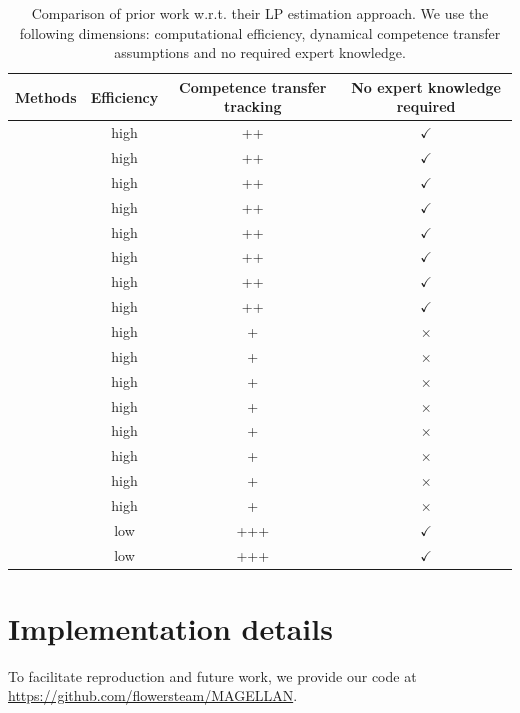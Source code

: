 \begin{table}[h!] 
\centering 
\small
\begin{tabular}{|l|c|c|c|}
\hline
\textbf{Methods} & \textbf{Efficiency} & \textbf{Competence transfer tracking} & \textbf{No expert knowledge required} \\ 
\hline 
\cite{oudeyer_intrinsic_2007} & high & ++ & $\checkmark$ \\ 
\cite{baranes_r-iac_2009} & high & ++ & $\checkmark$ \\ 
\cite{baranes_active_2013} & high & ++ & $\checkmark$ \\ 
\cite{moulin-frier_exploration_2013} & high & ++ & $\checkmark$ \\ 
\cite{moulin-frier_self-organization_2014} & high & ++ & $\checkmark$ \\ 
\cite{portelas_teacher_2019} & high & ++ & $\checkmark$ \\ 
\cite{forestier_modular_2016} & high & ++ & $\checkmark$ \\ 
\cite{kovac_grimgep_2023} & high & ++ & $\checkmark$ \\ 
\hline 
\cite{stout_competence_2010} & high & + & $\times$ \\ 
\cite{lopes_strategic_2012} & high & + & $\times$ \\ 
\cite{matiisen_teacher-student_2017} & high & + & $\times$ \\ 
\cite{fournier_accuracy-based_2018} & high & + & $\times$ \\ 
\cite{colas_curious_2019} & high & + & $\times$ \\ 
\cite{blaes_control_2019} & high & + & $\times$ \\ 
\cite{akakzia_grounding_2021} & high & + & $\times$ \\ 
\cite{kumar_practice_2024} & high & + & $\times$ \\ 
\hline 
\cite{kanitscheider_multi-task_2021} & low & +++ & $\checkmark$ \\ 
\cite{zhang_omni_2024} & low & +++ & $\checkmark$ \\ 
\hline 
\end{tabular}
\caption{Comparison of prior work w.r.t. their LP estimation approach. We use the following dimensions: computational efficiency, dynamical competence transfer assumptions and no required expert knowledge.} 
\label{tab:table_lp_literature}
\end{table}

\newpage
\section{Implementation details} \label{app:implementation_details}
To facilitate reproduction and future work, we provide our code at \url{https://github.com/flowersteam/MAGELLAN}.

